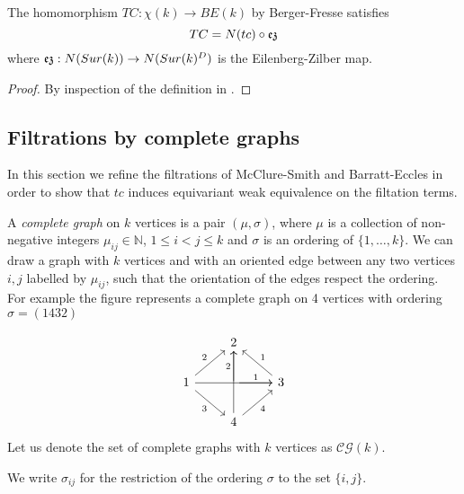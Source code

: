 \begin{proposition}
The homomorphism $TC:\chi(k) \to BE(k)$ by Berger-Fresse satisfies
$$TC=N(tc) \circ \operatorname{\mathfrak{ez}}$$ where $\operatorname{\mathfrak{ez}}:N(Sur(k)) \to 
N(Sur(k)^D)$ is the Eilenberg-Zilber map.
\end{proposition}

\begin{proof}
By inspection of the definition in \cite{BFsmall}. %
\end{proof}





\subsection{Filtrations by complete graphs}
In this section we refine the filtrations of McClure-Smith and Barratt-Eccles in order to show that $tc$ induces equivariant weak equivalence on the filtation terms.

\begin{definition}
		A \textit{complete graph} on $k$ vertices is
		a pair $(\mu,\sigma)$, where $\mu$ is a collection of non-negative integers $\mu_{ij}\in\mathbb{N}$, $1 \leq i < j \leq k$
  and $\sigma$ is an ordering of
  $\{1,\dots,k\}$.
  We can draw a graph with $k$ vertices and with an oriented edge between any two vertices $i,j$
  labelled by $\mu_{ij}$, such that the orientation of the edges respect the ordering.
  For example the figure represents a complete graph on 4 vertices with ordering $\sigma=(1432)$


\begin{equation*}
	\begin{tikzcd}
		\ & 2 & \  \\
		1 \arrow[ur,"2"] \arrow[rr] \arrow[dr,"3"']& \arrow[r,"1"] \arrow[u,"2"] & 3 \arrow[ul,"1"']  \\
		\ & 4 \arrow[ur,"4"'] \arrow[uu] & \
	\end{tikzcd}
\end{equation*}
Let us denote the set of complete graphs with $k$ vertices as $\mathcal{CG}(k)$.

We write $\sigma_{ij}$ for the restriction of the ordering $\sigma$ to the set $\{i,j\}$.
	\end{definition}

